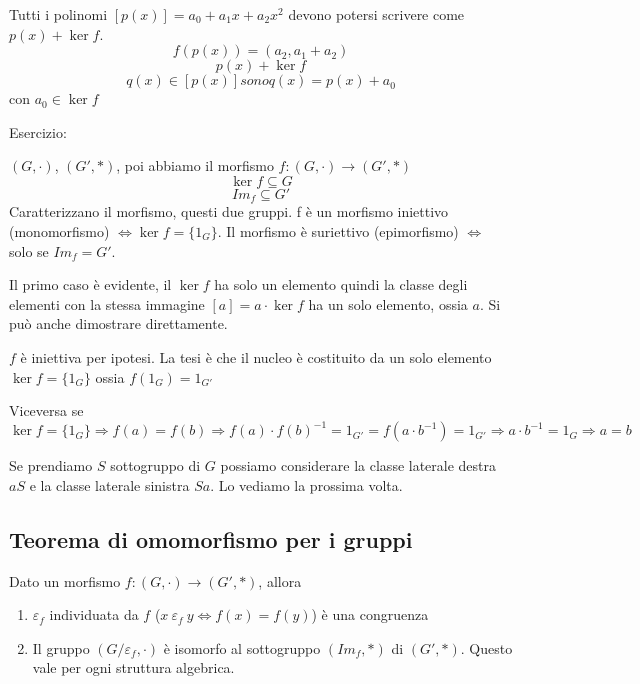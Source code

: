Tutti i polinomi $[p(x)] = a_0 + a_1 x + a_2 x^2$ devono potersi scrivere come $p(x) + \ker f$.
\[
f(p(x)) = (a_2, a_1 + a_2)
\]
\[
p(x) + \ker f
\]
\[
q(x) \in [p(x)] sono q(x) = p(x) + a_0
\]
con $a_0 \in \ker f$

Esercizio:

$(G, \cdot)$, $(G', \ast)$, poi abbiamo il morfismo $f : (G, \cdot) \to (G', \ast)$
\[
\ker f \subseteq G
\]
\[
Im_f \subseteq G'
\]
Caratterizzano il morfismo, questi due gruppi. f \`e un morfismo iniettivo (monomorfismo) $\Leftrightarrow \ker f = \{ 1_G\}$. Il morfismo \`e suriettivo (epimorfismo) $\Leftrightarrow$ solo se $Im_f = G'$.

Il primo caso \`e evidente, il $\ker f$ ha solo un elemento quindi la classe degli elementi con la stessa immagine $[a] = a \cdot \ker f$ ha un solo elemento, ossia $a$. Si pu\`o anche dimostrare direttamente.

$f$ \`e iniettiva per ipotesi. La tesi \`e che il nucleo \`e costituito da un solo elemento $\ker f = \{ 1_G \} $ ossia $f(1_G) = 1_{G'}$

Viceversa se $\ker f = \{ 1_G \} \Rightarrow f(a) = f(b) \Rightarrow f(a) \cdot f(b)^{-1} = 1_{G'} = f(a \cdot b^{-1}) = 1_{G'} \Rightarrow a \cdot b^{-1} = 1_G \Rightarrow a = b$

Se prendiamo $S$ sottogruppo di $G$ possiamo considerare la classe laterale destra $a S$ e la classe laterale sinistra $S a$. Lo vediamo la prossima volta. 

\subsection{Teorema di omomorfismo per i gruppi}

Dato un morfismo $f : (G, \cdot) \to (G', \ast)$, allora 
\begin{enumerate}
    \item $\varepsilon_f$ individuata da $f$ ($x \ \varepsilon_f \ y \Leftrightarrow f(x) = f(y)$) \`e una congruenza
    \item Il gruppo $(G / \varepsilon_f, \cdot)$ \`e isomorfo al sottogruppo $(Im_f, \ast)$ di $(G', \ast)$. Questo vale per ogni struttura algebrica.
\end{enumerate}

